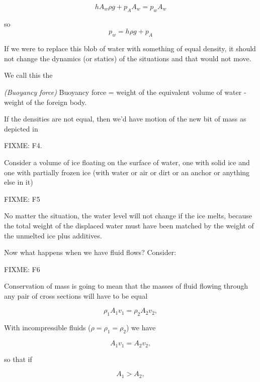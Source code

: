 \begin{equation}\label{eqn:continuumL13:20}
h A_w \rho g + p_A A_w = p_w A_w
\end{equation}

so
\begin{equation}\label{eqn:continuumL13:40}
p_w = h \rho g + p_A
\end{equation}

If we were to replace this blob of water with something of equal density, it should not change the dynamics (or statics) of the situations and that would not move.

We call this the

\begin{definition}
\emph{(Buoyancy force)}
\label{dfn:continuumL13:60}
Buoyancy force = 
weight of the equivalent volume of water - weight of the foreign body.
\end{definition}

If the densities are not equal, then we'd have motion of the new bit of mass as depicted in

FIXME: F4.

Consider a volume of ice floating on the surface of water, one with solid ice and one with partially frozen ice (with water or air or dirt or an anchor or anything else in it)

FIXME: F5

No matter the situation, the water level will not change if the ice melts, because the total weight of the displaced water must have been matched by the weight of the unmelted ice plus additives.

Now what happens when we have fluid flows?  Consider:

FIXME: F6

Conservation of mass is going to mean that the masses of fluid flowing through any pair of cross sections will have to be equal

\begin{equation}\label{eqn:continuumL13:80}
\rho_1 A_1 v_1 = \rho_2 A_2 v_2,
\end{equation}

With incompressible fluids ($\rho = \rho_1 = \rho_2$) we have

\begin{equation}\label{eqn:continuumL13:100}
A_1 v_1 = A_2 v_2,
\end{equation}

so that if 

\begin{equation}\label{eqn:continuumL13:120}
A_1 > A_2,
\end{equation}

